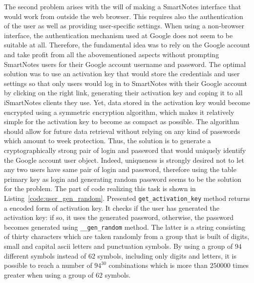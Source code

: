 \begin{itemize}
{The second problem arises with the will of making a SmartNotes interface that would work from outside the web browser. This requires also the authentication of the user as well as providing user-specific settings. When using a non-browser interface, the authentication mechanism used at Google does not seem to be suitable at all. Therefore, the fundamental idea was to rely on the Google account and take profit from all the abovementioned aspects without prompting SmartNotes users for their Google account username and password. The optimal solution was to use an activation key that would store the credentials and user settings so that only users would log in to SmartNotes with their Google account by clicking on the right link, generating their activation key and coping it to all iSmartNotes clients they use. Yet, data stored in the activation key would become encrypted using a symmetric encryption algorithm, which makes it relatively simple for the activation key to become as compact as possible. The algorithm should allow for future data retrieval without relying on any kind of passwords which amount to week protection. Thus, the solution is to generate a cryptographically strong pair of login and password that would uniquely identify the Google account user object.
Indeed, uniqueness is strongly desired not to let any two users have same pair of login and password, therefore using the table primary key as login and generating random password seems to be the solution for the problem. The part of code realizing this task is shown in Listing~\ref{code:user_gen_random}. Presented \texttt{get\_activation\_key} method returns a encoded form of activation key. It checks if the user has generated the activation key: if so, it uses the generated password, otherwise, the password becomes generated using \texttt{\_\_gen\_random} method. The latter is a string consisting of thirty characters which are taken randomly from a group that is built of digits, small and capital ascii letters and punctuation symbols. By using a group of $94$ different symbols instead of $62$ symbols, including only digits and letters, it is possible to reach a number of $94^{30}$ combinations which is more than $250000$ times greater when using a group of $62$ symbols.
\lstset{language=Python,caption=Part of Python User class used to model SmartNotes users.,label=code:user_gen_random,
basicstyle=\scriptsize,         %
showspaces=false,               %
showstringspaces=false,         %
}}
\end{itemize}
